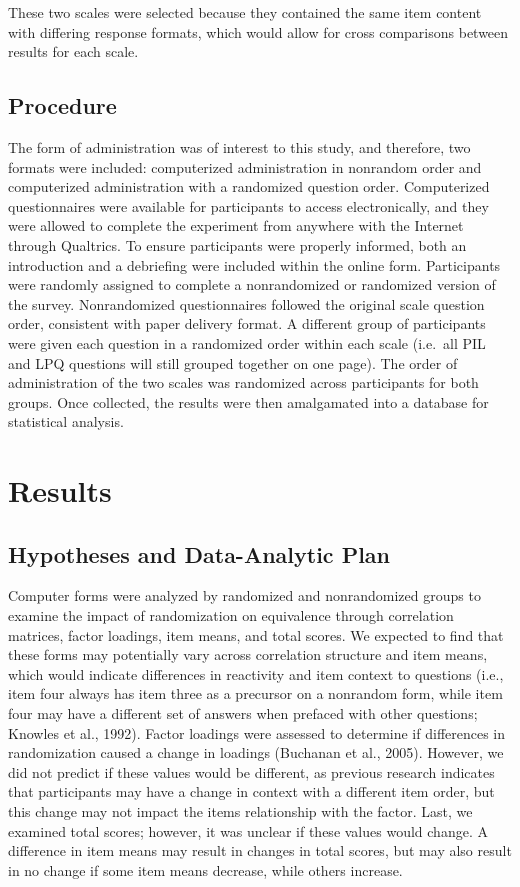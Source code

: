 \documentclass[english,man, mask]{apa6}
\theoremstyle{definition}
\theoremstyle{definition}
\theoremstyle{definition}
\theoremstyle{remark}
\begin{document}
These two scales were selected because they contained the same item
content with differing response formats, which would allow for cross
comparisons between results for each scale.

\subsection{Procedure}\label{procedure}

The form of administration was of interest to this study, and therefore,
two formats were included: computerized administration in nonrandom
order and computerized administration with a randomized question order.
Computerized questionnaires were available for participants to access
electronically, and they were allowed to complete the experiment from
anywhere with the Internet through Qualtrics. To ensure participants
were properly informed, both an introduction and a debriefing were
included within the online form. Participants were randomly assigned to
complete a nonrandomized or randomized version of the survey.
Nonrandomized questionnaires followed the original scale question order,
consistent with paper delivery format. A different group of participants
were given each question in a randomized order within each scale
(i.e.~all PIL and LPQ questions will still grouped together on one
page). The order of administration of the two scales was randomized
across participants for both groups. Once collected, the results were
then amalgamated into a database for statistical analysis.

\section{Results}\label{results}

\subsection{Hypotheses and Data-Analytic
Plan}\label{hypotheses-and-data-analytic-plan}

Computer forms were analyzed by randomized and nonrandomized groups to
examine the impact of randomization on equivalence through correlation
matrices, factor loadings, item means, and total scores. We expected to
find that these forms may potentially vary across correlation structure
and item means, which would indicate differences in reactivity and item
context to questions (i.e., item four always has item three as a
precursor on a nonrandom form, while item four may have a different set
of answers when prefaced with other questions; Knowles et al., 1992).
Factor loadings were assessed to determine if differences in
randomization caused a change in loadings (Buchanan et al., 2005).
However, we did not predict if these values would be different, as
previous research indicates that participants may have a change in
context with a different item order, but this change may not impact the
items relationship with the factor. Last, we examined total scores;
however, it was unclear if these values would change. A difference in
item means may result in changes in total scores, but may also result in
no change if some item means decrease, while others increase.
\end{document}
